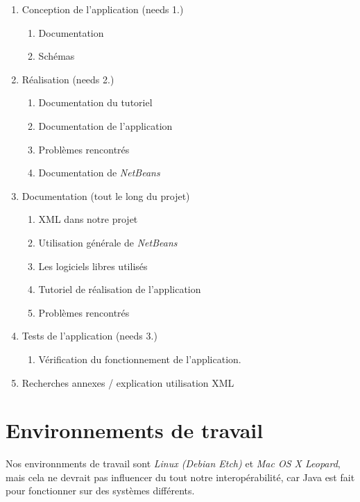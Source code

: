 \documentclass[a4paper, 11pt]{article}
\begin{document}
{{\begin{enumerate}
		\item Conception de l'application (needs 1.)
			
			\begin{enumerate}
				\item Documentation
				\item Schémas
			\end{enumerate}
			
		\item Réalisation (needs 2.)
		
			\begin{enumerate}
				\item Documentation du tutoriel
				\item Documentation de l'application
				\item Problèmes rencontrés
				\item Documentation de \emph{NetBeans}
			\end{enumerate}
		
		\item Documentation (tout le long du projet)
		
			\begin{enumerate}
				\item XML dans notre projet
				\item Utilisation générale de \emph{NetBeans}
				\item Les logiciels libres utilisés
				\item Tutoriel de réalisation de l'application
				\item Problèmes rencontrés
			\end{enumerate}
		
		\item Tests de l'application (needs 3.)
		
			\begin{enumerate}
				\item Vérification du fonctionnement de l'application.
			\end{enumerate}
			
		\item Recherches annexes / explication utilisation XML
		
	\end{enumerate}

	
\section{Environnements de travail}

	Nos environnments de travail sont \emph{Linux (Debian Etch)} et \emph{Mac OS X Leopard}, mais cela ne devrait pas influencer du tout notre interopérabilité, car Java est fait pour fonctionner sur des systèmes différents.

}}
\end{document}
